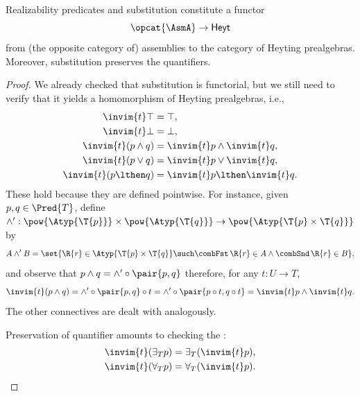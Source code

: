 \begin{proposition}
  Realizability predicates and substitution constitute a functor
  \begin{equation*}
    \opcat{\AsmA} \to \mathsf{Heyt}
  \end{equation*}
  from (the opposite category of) assemblies to the category of Heyting prealgebras.
  Moreover, substitution preserves the quantifiers.
\end{proposition}

\begin{proof}
  We already checked that substitution is functorial, but we still need to verify
  that it yields a homomorphism of Heyting prealgebras, i.e.,
  \begin{align*}
    \invim{t} \top &= \top,\\
    \invim{t} \bot &= \bot,\\
    \invim{t} (p \land q) &= \invim{t} p \land \invim{t} q,\\
    \invim{t} (p \lor q) &= \invim{t} p \lor \invim{t} q,\\
    \invim{t} (p \lthen q) &= \invim{t} p \lthen \invim{t} q.
  \end{align*}
  These hold because they are defined pointwise. For instance, given $p, q \in \Pred{T}$, define $\land' : \pow{\Atyp{\T{p}}} \times \pow{\Atyp{\T{q}}} \to \pow{\Atyp{\T{p} \times \T{q}}}$ by
  \begin{equation*}
    A \land' B =
    \set{ \R{r} \in \Atyp{\T{p} \times \T{q}} \such
      \combFst\,\R{r} \in A \land \combSnd\,\R{r} \in B },
  \end{equation*}
  and observe that $p \land q = \land' \circ \pair{p, q}$ therefore, for any $t : U \to T$,
  \begin{equation*}
    \invim{t}(p \land q) = \land' \circ \pair{p, q} \circ t
    = \land' \circ \pair{p \circ t, q \circ t} = \invim{t} p \land \invim{t} q.
  \end{equation*}
  The other connectives are dealt with analogously.

  Preservation of quantifier amounts to checking the :
  \begin{align*}
    \invim{t} (\exists_{T} p) &= \exists_{T} (\invim{t} p),\\
    \invim{t} (\forall_{T} p) &= \forall_{T} (\invim{t} p). \qedhere
  \end{align*}
\end{proof}

